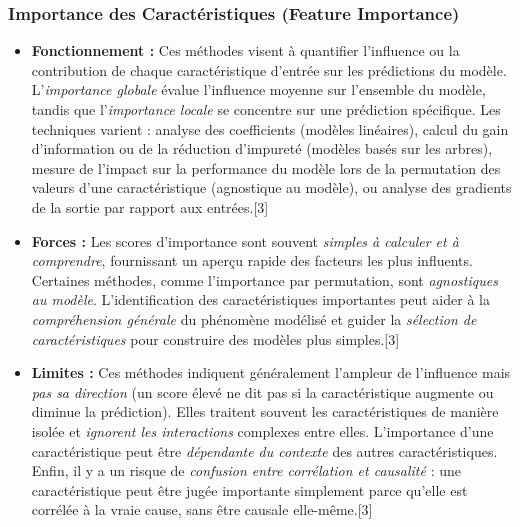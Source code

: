 \documentclass[11pt,a4paper]{article}
\begin{document}
\subsubsection{Importance des Caractéristiques (Feature Importance)}
\begin{itemize}
    \item \textbf{Fonctionnement :} Ces méthodes visent à quantifier l'influence ou la contribution de chaque caractéristique d'entrée sur les prédictions du modèle. L'\textit{importance globale} évalue l'influence moyenne sur l'ensemble du modèle, tandis que l'\textit{importance locale} se concentre sur une prédiction spécifique. Les techniques varient : analyse des coefficients (modèles linéaires), calcul du gain d'information ou de la réduction d'impureté (modèles basés sur les arbres), mesure de l'impact sur la performance du modèle lors de la permutation des valeurs d'une caractéristique (agnostique au modèle), ou analyse des gradients de la sortie par rapport aux entrées.[3]
    \item \textbf{Forces :} Les scores d'importance sont souvent \textit{simples à calculer et à comprendre}, fournissant un aperçu rapide des facteurs les plus influents. Certaines méthodes, comme l'importance par permutation, sont \textit{agnostiques au modèle}. L'identification des caractéristiques importantes peut aider à la \textit{compréhension générale} du phénomène modélisé et guider la \textit{sélection de caractéristiques} pour construire des modèles plus simples.[3]
    \item \textbf{Limites :} Ces méthodes indiquent généralement l'ampleur de l'influence mais \textit{pas sa direction} (un score élevé ne dit pas si la caractéristique augmente ou diminue la prédiction). Elles traitent souvent les caractéristiques de manière isolée et \textit{ignorent les interactions} complexes entre elles. L'importance d'une caractéristique peut être \textit{dépendante du contexte} des autres caractéristiques. Enfin, il y a un risque de \textit{confusion entre corrélation et causalité} : une caractéristique peut être jugée importante simplement parce qu'elle est corrélée à la vraie cause, sans être causale elle-même.[3]
\end{itemize}
\end{document}
